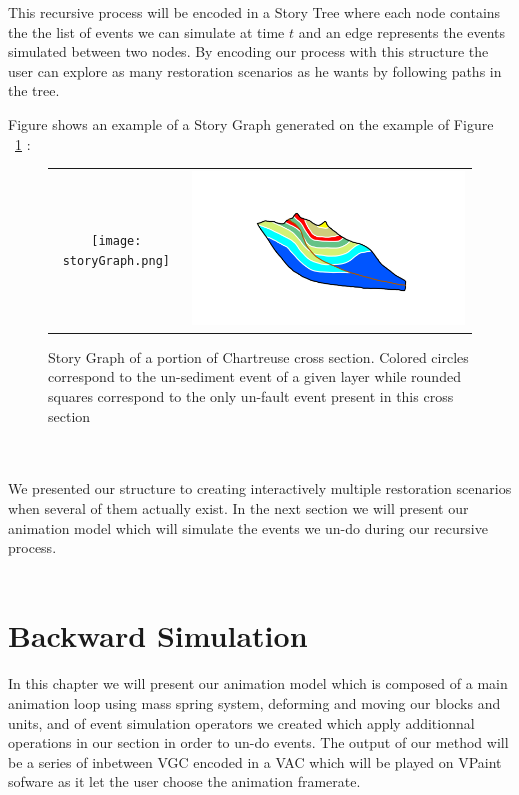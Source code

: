 \documentclass[12pt, a4paper]{report} %
\begin{document}
This recursive process will be encoded in a Story Tree where each node contains the the list of events we can simulate at time $t$ and an edge represents the events simulated between two nodes. By encoding our process with this structure the user can explore as many restoration scenarios as he wants by following paths in the tree.

Figure shows an example of a Story Graph generated on the example of Figure ~\ref{strorygraph} :

\begin{figure}[H]
\centering
\begin{tabular}{@{}cc@{}}
\texttt{[image: storyGraph.png]}&
\includegraphics[width=.95\textwidth]{chartreusedroite.png}\\
\end{tabular}
\caption{Story Graph of a portion of Chartreuse cross section. Colored circles correspond to the un-sediment event of a given layer while rounded squares correspond to the only un-fault event present in this cross section}
\label{strorygraph}
\end{figure}\\\\

We presented our structure to creating interactively multiple restoration scenarios when several of them actually exist. In the next section we will present our animation model which will simulate the events we un-do during our recursive process.\\\\

\chapter{Backward Simulation}
\label{ch:animationmodel}
In this chapter we will present our animation model which is composed of a main animation loop using mass spring system, deforming and moving our blocks and units, and of event simulation operators we created which apply additionnal operations in our section in order to un-do events. The output of our method will be a series of inbetween VGC encoded in a VAC which will be played on VPaint sofware \cite{vpaint} as it let the user choose the animation framerate.\\\\
\end{document}
